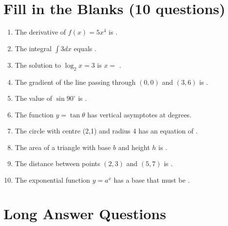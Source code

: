 \documentclass{../Templates/sbs-exam}
\begin{document}
\section*{Fill in the Blanks (10 questions)}
\begin{enumerate}
    \item The derivative of $f(x) = 5x^4$ is \underline{\hspace{2cm}}.
    
    \item The  integral $\int 3  dx$ equals \underline{\hspace{2cm}}.
    
    \item The solution to $\log_2 x = 3$ is $x =$ \underline{\hspace{2cm}}.
    
    \item The gradient of the line passing through $(0,0)$ and $(3,6)$ is \underline{\hspace{2cm}}.
    
    \item The value of $\sin 90^\circ$ is \underline{\hspace{2cm}}.
    
    \item The function $y = \tan \theta$ has vertical asymptotes at \underline{\hspace{2cm}} degrees.
    
    \item The circle with centre (2,1) and radius 4 has an equation of \underline{\hspace{2cm}}.
    
    \item The area of a triangle with base $b$ and height $h$ is \underline{\hspace{2cm}}.
    
   \item The distance between points $(2,3)$ and $(5,7)$ is \underline{\hspace{2cm}}.
    
    \item The exponential function $y = a^x$ has a base that must be \underline{\hspace{2cm}}.
\end{enumerate}

\newpage

\section*{Long Answer Questions}
\end{document}
